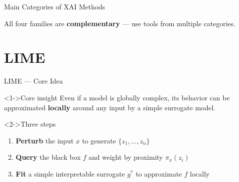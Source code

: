 \documentclass[aspectratio=169]{beamer}
\newcommand{\highlight}[1]{\textcolor{xaiaccent}{\textbf{#1}}}
\begin{document}
\begin{frame}{Main Categories of XAI Methods}
  \begin{center}
  \end{center}
  \vspace{0.3em}
  \begin{exampleblock}{}
    \centering
    All four families are \textbf{complementary} --- use tools from multiple categories.
  \end{exampleblock}
\end{frame}

\section{LIME}

\begin{frame}{LIME --- Core Idea}
  \begin{block}<1->{Core insight}
    Even if a model is globally complex, its behavior can be approximated
    \highlight{locally} around any input by a simple surrogate model.
  \end{block}
  \vspace{0.5em}
  \begin{block}<2->{Three steps}
    \begin{enumerate}
      \item \textbf{Perturb} the input $x$ to generate $\{z_1,\dots,z_n\}$
      \item \textbf{Query} the black box $f$ and weight by proximity $\pi_x(z_i)$
      \item \textbf{Fit} a simple interpretable surrogate $g^*$ to approximate $f$ locally
    \end{enumerate}
  \end{block}
\end{frame}
\end{document}
